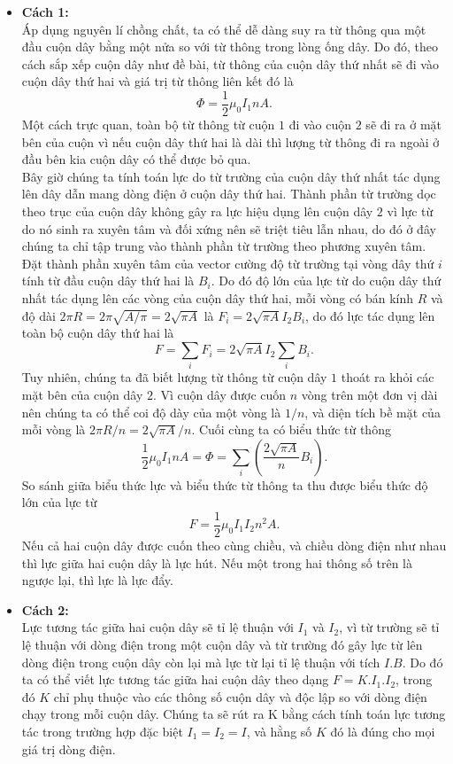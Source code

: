 \begin{loigiai}
    \begin{itemize}
        \item \textbf{Cách 1:}
        \\  Áp dụng nguyên lí chồng chất, ta có thể dễ dàng suy ra từ thông qua một đầu cuộn dây bằng một nửa so với từ thông trong lòng ống dây. Do đó, theo cách sắp xếp cuộn dây như đề bài, từ thông của cuộn dây thứ nhất sẽ đi vào cuộn dây thứ hai và giá trị từ thông liên kết đó là
        \[\Phi=\dfrac{1}{2}\mu_0I_1nA.\]
        Một cách trực quan, toàn bộ từ thông từ cuộn $1$ đi vào cuộn $2$ sẽ đi ra ở mặt bên của cuộn vì nếu cuộn dây thứ hai là dài thì lượng từ thông đi ra ngoài ở đầu bên kia cuộn dây có thể được bỏ qua.
        \\Bây giờ chúng ta tính toán lực do từ trường của cuộn dây thứ nhất tác dụng lên dây dẫn mang dòng điện ở cuộn dây thứ hai. Thành phần từ trường dọc theo trục của cuộn dây không gây ra lực hiệu dụng lên cuộn dây $2$ vì lực từ do nó sinh ra xuyên tâm và đối xứng nên sẽ triệt tiêu lẫn nhau, do đó ở đây chúng ta chỉ tập trung vào thành phần từ trường theo phương xuyên tâm.
        \\Đặt thành phần xuyên tâm của vector cường độ từ trường tại vòng dây thứ $i$ tính từ đầu cuộn dây thứ hai là $B_i$. Do đó độ lớn của lực từ do cuộn dây thứ nhất tác dụng lên các vòng của cuộn dây thứ hai, mỗi vòng có bán kính $R$ và độ dài $2\pi R=2 \pi \sqrt{A/\pi}=2\sqrt{\pi A}$ là $F_i=2\sqrt{\pi A}I_2B_i$, do đó lực tác dụng lên toàn bộ cuộn dây thứ hai là
        \[F = \sum\limits_i {{F_i}}  = 2\sqrt {\pi A} {I_2}\sum\limits_i {{B_i}}.\]
        Tuy nhiên, chúng ta đã biết lượng từ thông từ cuộn dây $1$ thoát ra khỏi các mặt bên của cuộn dây $2$. Vì cuộn dây được cuốn $n$ vòng trên một đơn vị dài nên chúng ta có thể coi độ dày của một vòng là $1/n$, và diện tích bề mặt của mỗi vòng là $2\pi R/n = 2\sqrt {\pi A} /n$. Cuối cùng ta có biểu thức từ thông
        \[\frac{1}{2}{\mu _0}{I_1}nA = \Phi  = \sum\limits_i {\left( {\frac{{2\sqrt {\pi A} }}{n}{B_i}} \right).} \]
        So sánh giữa biểu thức lực và biểu thức từ thông ta thu được biểu thức độ lớn của lực từ
        \[F = \frac{1}{2}{\mu _0}{I_1}{I_2}{n^2}A.\]
        Nếu cả hai cuộn dây được cuốn theo cùng chiều, và chiều dòng điện như nhau thì lực giữa hai cuộn dây là lực hút. Nếu một trong hai thông số trên là ngược lại, thì lực là lực đẩy.
        \item \textbf{Cách 2:}
        \\Lực tương tác giữa hai cuộn dây sẽ tỉ lệ thuận với $I_1$ và $I_2$, vì từ trường sẽ tỉ lệ thuận với dòng điện trong một cuộn dây và từ trường đó gây lực từ lên dòng điện trong cuộn dây còn lại mà lực từ lại tỉ lệ thuận với tích $I.B$. Do đó ta có thể viết lực tương tác giữa hai cuộn dây theo dạng $F=K.I_1.I_2$, trong đó $K$ chỉ phụ thuộc vào các thông số cuộn dây và độc lập so với dòng điện chạy trong mỗi cuộn dây. Chúng ta sẽ rút ra K bằng cách tính toán lực tương tác trong trường hợp đặc biệt $I_1=I_2=I$, và hằng số $K$ đó là đúng cho mọi giá trị dòng điện.

\end{itemize}
\end{loigiai}
